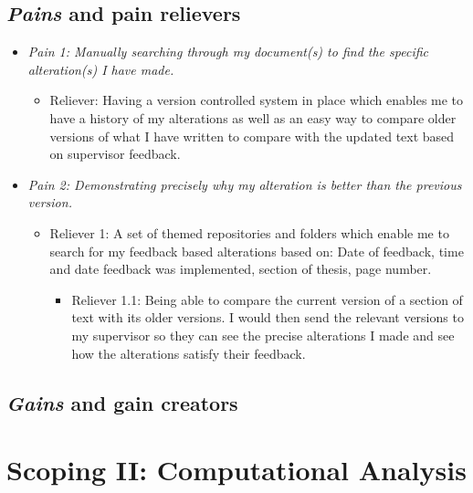 \documentclass{article}
\begin{document}
\subsection{\textit {Pains} and pain relievers}

\begin{itemize}
    \item \textit{Pain 1: Manually searching through my document(s) to find the specific alteration(s) I have made.} 
    \begin{itemize}
        \item  Reliever: Having a version controlled system in place which enables me to have a history of my alterations as well as an easy way to compare older versions of what I have written to compare with the updated text based on supervisor feedback. 
    \end{itemize}
    \item \textit{Pain 2: Demonstrating precisely why my alteration is better than the previous version.} 
    \begin{itemize}
        \item  Reliever 1: A set of themed repositories and folders which enable me to search for my feedback based alterations based on: Date of feedback, time and date feedback was implemented, section of thesis, page number.
        \begin{itemize}
        \item Reliever 1.1: Being able to compare the current version of a section of text with its older versions. I would then send the relevant versions to my supervisor so they can see the precise alterations I made and see how the alterations satisfy their feedback.
        \end{itemize}
    \end{itemize}
\end{itemize}

\subsection{\textit {Gains} and gain creators}

\section{Scoping II: Computational Analysis}
\end{document}
